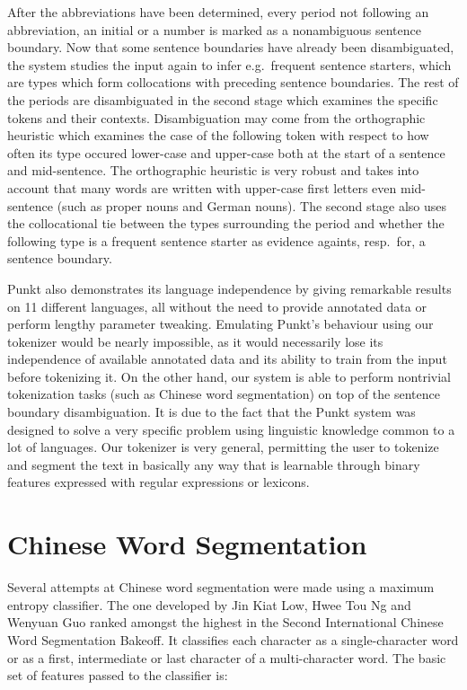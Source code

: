 After the abbreviations have been determined, every period not following an
abbreviation, an initial or a number is marked as a nonambiguous sentence
boundary. Now that some sentence boundaries have already been disambiguated,
the system studies the input again to infer e.g.\ frequent sentence starters,
which are types which form collocations with preceding sentence boundaries. The
rest of the periods are disambiguated in the second stage which examines the
specific tokens and their contexts. Disambiguation may come from the
orthographic heuristic which examines the case of the following token with
respect to how often its type occured lower-case and upper-case both at the
start of a sentence and mid-sentence. The orthographic heuristic is very robust
and takes into account that many words are written with upper-case first
letters even mid-sentence (such as proper nouns and German nouns). The second
stage also uses the collocational tie between the types surrounding the period
and whether the following type is a frequent sentence starter as evidence
againts, resp.\ for, a sentence boundary.

Punkt also demonstrates its language independence by giving remarkable results
on 11 different languages, all without the need to provide annotated data or
perform lengthy parameter tweaking. Emulating Punkt's behaviour using our
tokenizer would be nearly impossible, as it would necessarily lose its
independence of available annotated data and its ability to train from the
input before tokenizing it. On the other hand, our system is able to perform
nontrivial tokenization tasks (such as Chinese word segmentation) on top of the
sentence boundary disambiguation. It is due to the fact that the Punkt system
was designed to solve a very specific problem using linguistic knowledge common
to a lot of languages. Our tokenizer is very general, permitting the user to
tokenize and segment the text in basically any way that is learnable through
binary features expressed with regular expressions or lexicons.

\section{Chinese Word Segmentation}
\label{survey-chinese}

Several attempts at Chinese word segmentation were made using a maximum entropy
classifier. The one developed by Jin Kiat Low, Hwee Tou Ng and Wenyuan Guo
ranked amongst the highest in the Second International Chinese Word
Segmentation Bakeoff. It classifies each character as a single-character word
or as a first, intermediate or last character of a multi-character word. The
basic set of features passed to the classifier is:

